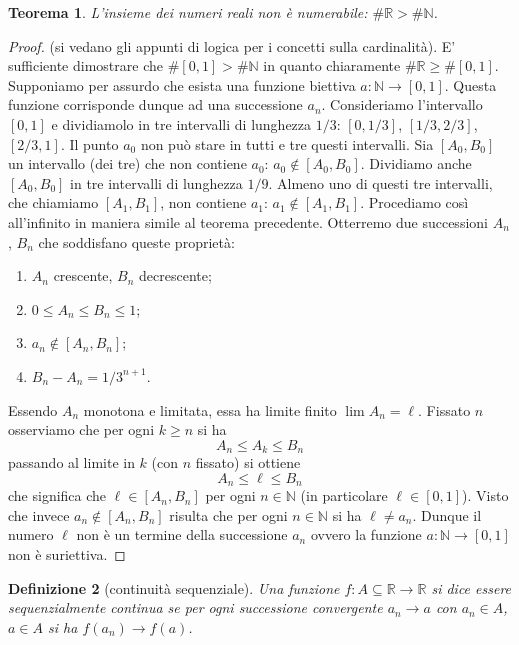 \documentclass[italian,a4paper,oneside,headinclude]{scrbook}
\renewcommand{\subset}{\subseteq}
\newcommand{\NN}{\mathbb N}
\newcommand{\RR}{\mathbb R}
\newtheorem{theorem}{Teorema}
\newtheorem{definition}[theorem]{Definizione}
\begin{document}
\begin{theorem}
L'insieme dei numeri reali non è numerabile: $\#\RR > \#\NN$.
\end{theorem}
%
\begin{proof}
(si vedano gli appunti di logica per i concetti sulla cardinalità).
E' sufficiente dimostrare che $\#[0,1] > \#\NN$ in quanto
chiaramente $\#\RR \ge \#[0,1]$.
Supponiamo per assurdo che esista una funzione biettiva $a\colon \NN \to [0,1]$.
Questa funzione corrisponde dunque ad una successione $a_n$.
Consideriamo l'intervallo $[0,1]$ e dividiamolo in tre intervalli  di lunghezza $1/3$: $[0,1/3]$, $[1/3,2/3]$, $[2/3,1]$. Il punto $a_0$ non può stare in tutti e tre questi intervalli. Sia $[A_0,B_0]$ un intervallo (dei tre) che non contiene $a_0$: $a_0 \not \in [A_0,B_0]$.
Dividiamo anche $[A_0,B_0]$ in tre intervalli di lunghezza $1/9$.
Almeno uno di questi tre intervalli, che chiamiamo $[A_1,B_1]$,
non contiene $a_1$: $a_1 \not \in [A_1,B_1]$.
Procediamo così all'infinito in maniera simile al teorema precedente.
Otterremo due successioni $A_n$, $B_n$ che soddisfano queste proprietà:
\begin{enumerate}
\item $A_n$ crescente, $B_n$ decrescente;
\item $0\le A_n \le B_n \le 1$;
\item $a_n \not \in [A_n, B_n]$;
\item $B_n - A_n = 1/3^{n+1}$.
\end{enumerate}

Essendo $A_n$ monotona e limitata, essa ha limite finito $\lim A_n = \ell$.
Fissato $n$ osserviamo che per ogni $k\ge n$ si ha
\[
  A_n \le A_k \le B_n
\]
passando al limite in $k$ (con $n$ fissato) si ottiene
\[
  A_n \le \ell \le B_n
\]
che significa che $\ell \in [A_n, B_n]$ per ogni $n\in \NN$
(in particolare $\ell \in [0,1]$).
Visto che invece $a_n \not \in [A_n, B_n]$ risulta che per
ogni $n\in \NN$ si ha $\ell \neq a_n$.
Dunque il numero $\ell$ non è un termine della successione $a_n$
ovvero la funzione $a\colon \NN \to [0,1]$ non è suriettiva.
\end{proof}


\begin{definition}[continuità sequenziale]
Una funzione $f\colon A \subset \RR \to \RR$ si dice essere
\emph{sequenzialmente continua} se per ogni successione
convergente $a_n \to a$ con $a_n\in A$, $a \in A$ si ha
$f(a_n)\to f(a)$.
\end{definition}
\end{document}
